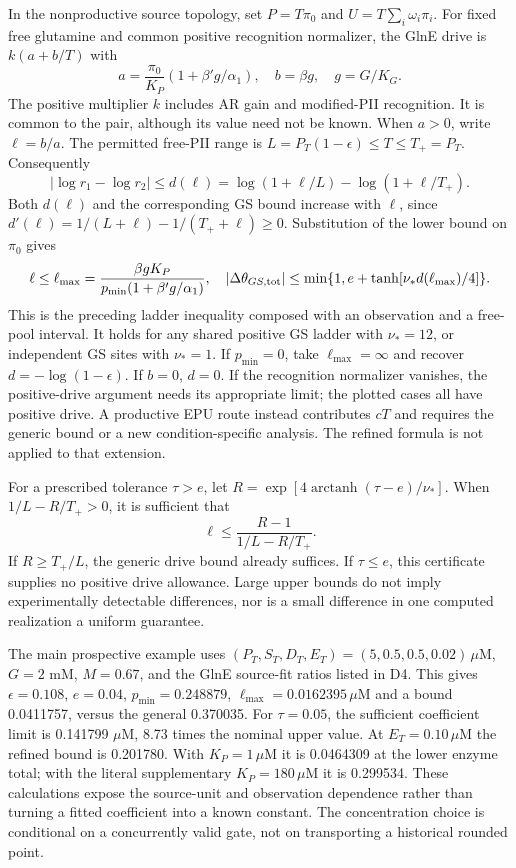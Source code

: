\documentclass[11pt]{article}
\begin{document}
In the nonproductive source topology, set $P=T\pi_0$ and $U=T\sum_i\omega_i\pi_i$. For fixed free glutamine and common positive recognition normalizer, the GlnE drive is $k(a+b/T)$ with
\[
 a=\frac{\pi_0}{K_P}(1+\beta'g/\alpha_1),\quad b=\beta g,\quad g=G/K_G.
\]
The positive multiplier $k$ includes AR gain and modified-PII recognition. It is common to the pair, although its value need not be known. When $a>0$, write $\ell=b/a$. The permitted free-PII range is $L=P_T(1-\epsilon)\leq T\leq T_+=P_T$. Consequently
\[
 |\log r_1-\log r_2|\leq d(\ell)
 =\log(1+\ell/L)-\log(1+\ell/T_+).
\]
Both $d(\ell)$ and the corresponding GS bound increase with $\ell$, since $d'(\ell)=1/(L+\ell)-1/(T_++\ell)\geq0$. Substitution of the lower bound on $\pi_0$ gives
\[
 \ell\leq\ell_{\max}=\frac{\beta gK_P}{p_{\min}(1+\beta'g/\alpha_1)},\quad
 |\Delta\theta_{GS,\rm tot}|\leq\min\{1,e+\tanh[\nu_*d(\ell_{\max})/4]\}.
\]
This is the preceding ladder inequality composed with an observation and a free-pool interval. It holds for any shared positive GS ladder with $\nu_*=12$, or independent GS sites with $\nu_*=1$. If $p_{\min}=0$, take $\ell_{\max}=\infty$ and recover $d=-\log(1-\epsilon)$. If $b=0$, $d=0$. If the recognition normalizer vanishes, the positive-drive argument needs its appropriate limit; the plotted cases all have positive drive. A productive EPU route instead contributes $cT$ and requires the generic bound or a new condition-specific analysis. The refined formula is not applied to that extension.

For a prescribed tolerance $\tau>e$, let $R=\exp[4\operatorname{arctanh}(\tau-e)/\nu_*]$. When $1/L-R/T_+>0$, it is sufficient that
\[
 \ell\leq\frac{R-1}{1/L-R/T_+}.
\]
If $R\geq T_+/L$, the generic drive bound already suffices. If $\tau\leq e$, this certificate supplies no positive drive allowance. Large upper bounds do not imply experimentally detectable differences, nor is a small difference in one computed realization a uniform guarantee.

The main prospective example uses $(P_T,S_T,D_T,E_T)=(5,0.5,0.5,0.02)\,\mu$M, $G=2$ mM, $M=0.67$, and the GlnE source-fit ratios listed in D4. This gives $\epsilon=0.108$, $e=0.04$, $p_{\min}=0.248879$, $\ell_{\max}=0.0162395\,\mu$M and a bound 0.0411757, versus the general 0.370035. For $\tau=0.05$, the sufficient coefficient limit is 0.141799 $\mu$M, 8.73 times the nominal upper value. At $E_T=0.10\,\mu$M the refined bound is 0.201780. With $K_P=1\,\mu$M it is 0.0464309 at the lower enzyme total; with the literal supplementary $K_P=180\,\mu$M it is 0.299534. These calculations expose the source-unit and observation dependence rather than turning a fitted coefficient into a known constant. The concentration choice is conditional on a concurrently valid gate, not on transporting a historical rounded point.
\end{document}
